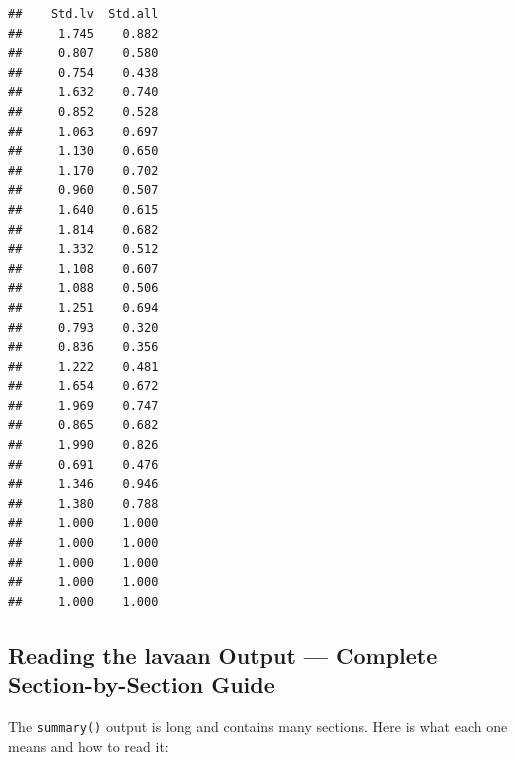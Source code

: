 \documentclass[
]{article}
\begin{document}
\begin{verbatim}
##    Std.lv  Std.all
##     1.745    0.882
##     0.807    0.580
##     0.754    0.438
##     1.632    0.740
##     0.852    0.528
##     1.063    0.697
##     1.130    0.650
##     1.170    0.702
##     0.960    0.507
##     1.640    0.615
##     1.814    0.682
##     1.332    0.512
##     1.108    0.607
##     1.088    0.506
##     1.251    0.694
##     0.793    0.320
##     0.836    0.356
##     1.222    0.481
##     1.654    0.672
##     1.969    0.747
##     0.865    0.682
##     1.990    0.826
##     0.691    0.476
##     1.346    0.946
##     1.380    0.788
##     1.000    1.000
##     1.000    1.000
##     1.000    1.000
##     1.000    1.000
##     1.000    1.000
\end{verbatim}

\subsection{Reading the lavaan Output --- Complete Section-by-Section
Guide}\label{reading-the-lavaan-output-complete-section-by-section-guide}

The \texttt{summary()} output is long and contains many sections. Here
is what each one means and how to read it:
\end{document}
